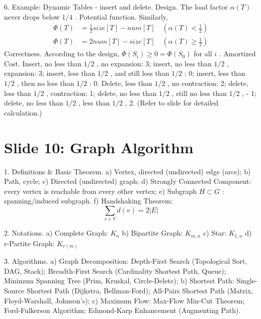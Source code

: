 \documentclass[10pt,a4paper]{article}
\begin{document}
6. Example: Dynamic Tables - insert and delete.
Design. The load factor \(\alpha (T)\) never drops below \(1 / 4\) .
Potential function. Similarly,
\begin{align*}
\Phi (T) &= \frac{1}{2} size[T] - num[T] \quad (\alpha (T)< \frac{1}{2}) \\
\Phi (T) &= 2num[T] - size[T] \quad (\alpha (T)\geq \frac{1}{2})
\end{align*}
Correctness. According to the design, \(\Phi (S_i)\geq 0 = \Phi (S_0)\) for all \(i\) .
Amortized Cost. Insert, no less than \(1 / 2\) , no expansion: 3; insert, no less than \(1 / 2\) , expansion: 3; insert, less than \(1 / 2\) , and still less than \(1 / 2\) : 0; insert, less than \(1 / 2\) , then no less than \(1 / 2\) : 0. Delete, less than \(1 / 2\) , no contraction: 2; delete, less than \(1 / 2\) , contraction: 1; delete, no less than \(1 / 2\) , still no less than \(1 / 2\) , - 1; delete, no less than \(1 / 2\) , less than \(1 / 2\) , 2. (Refer to slide for detailed calculation.)

\section*{Slide 10: Graph Algorithm}

1. Definitions \& Basic Theorem.
a) Vertex, directed (undirected) edge (arcs);
b) Path, cycle;
c) Directed (undirected) graph;
d) Strongly Connected Component: every vertex is reachable from every other vertex;
e) Subgraph \(H\subset G\) : spanning/induced subgraph.
f) Handshaking Theorem:
\[
\sum_{v\in V}d(v) = 2|E|
\]

2. Notations.
a) Complete Graph: \(K_{n}\)
b) Bipartite Graph: \(K_{m,n}\)
c) Star: \(K_{1,n}\)
d) r-Partite Graph: \(K_{r(m)}\)

3. Algorithms.
a) Graph Decomposition: Depth-First Search (Topological Sort, DAG, Stack); Breadth-First Search (Cardinality Shortest Path, Queue); Minimum Spanning Tree (Prim, Kruskal, Circle-Delete);
b) Shortest Path: Single-Source Shortest Path (Dijkstra, Bellman-Ford); All-Pairs Shortest Path (Matrix, Floyd-Warshall, Johnson's);
c) Maximum Flow: Max-Flow Min-Cut Theorem; Ford-Fulkerson Algorithm; Edmond-Karp Enhancement (Augmenting Path).
\end{document}
